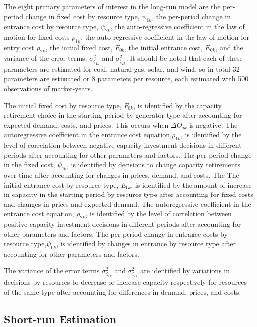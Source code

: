 \documentclass[12pt]{article}
\begin{document}
The eight primary parameters of interest in the long-run model are the per-period change in fixed cost by resource type, $\psi_{1k}$, the per-period change in entrance cost by resource type, $\psi_{2k}$, the auto-regressive coefficient in the law of motion for fixed costs $\rho_{1k}$, the auto-regressive coefficient in the law of motion for entry cost $\rho_{2k}$, the initial fixed cost, $F_{0k}$, the initial entrance cost, $E_{0k}$, and the variance of the error terms, $\sigma^2_{\zeta_{1k}}$ and $\sigma^2_{\zeta_{2k}}$. It should be noted that each of these parameters are estimated for coal, natural gas, solar, and wind, so in total 32 parameters are estimated or 8 parameters per resource, each estimated with 500 observations of market-years.

The initial fixed cost by resource type, $F_{0k}$, is identified by the capacity retirement choice in the starting period by generator type after accounting for expected demand, costs, and prices. This occurs when $\Delta O_{jk}$ is negative. The autoregressive coefficient in the entrance cost equation,$\rho_{1k}$, is identified by the level of correlation between negative capacity investment decisions in different periods after accounting for other parameters and factors. The per-period change in the fixed cost, $\psi_{1k}$, is identified by decisions to change capacity retirements over time after accounting for changes in prices, demand, and costs. The  The initial entrance cost by resource type, $E_{0k}$, is identified by the amount of increase in capacity in the starting period by resource type after accounting for fixed costs and changes in prices and expected demand. The autoregressive coefficient in the entrance cost equation, $\rho_{2k}$, is identified by the level of correlation between positive capacity investment decisions in different periods after accounting for other parameters and factors. The per-period change in entrance costs by resource type,$\psi_{0k}$, is identified by changes in entrance by resource type after accounting for other parameters and factors.

The variance of the error terms $\sigma_{\zeta_{1k}}^2$ and $\sigma_{\zeta_{2k}}^2$ are identified by variations in decisions by resources to decrease or increase capacity respectively for resources of the same type after accounting for differences in demand, prices, and costs.

\subsection{Short-run Estimation}
\end{document}
